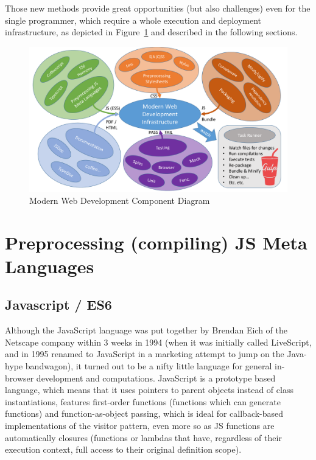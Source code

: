 Those new methods provide great opportunities (but also challenges) even for the single programmer, which require a whole execution and deployment infrastructure, as depicted in Figure~\ref{fig:webdev_cycle_components} and described in the following sections.

\begin{landscape}
\begin{figure}[ht]
	\centering
	\hspace*{-1cm}
	\vspace*{1cm}
	\includegraphics[width=1.8\textwidth]{figures/Modern_Web_Dev}
	\caption{Modern Web Development Component Diagram}
	\label{fig:webdev_cycle_components}
\end{figure}
\end{landscape}


\section{Preprocessing (compiling) JS Meta Languages}
\label{sect:language}

	\subsection{Javascript / ES6}
	\label{ssect:js_es6}
	
	Although the JavaScript language was put together by Brendan Eich of the Netscape company within 3 weeks in 1994 (when it was initially called LiveScript, and in 1995 renamed to JavaScript in a marketing attempt to jump on the Java-hype bandwagon), it turned out to be a nifty little language for general in-browser development and computations. JavaScript is a prototype based language, which means that it uses pointers to parent objects instead of class instantiations, features first-order functions (functions which can generate functions) and function-as-object passing, which is ideal for callback-based implementations of the visitor pattern, even more so as JS functions are automatically closures (functions or lambdas that have, regardless of their execution context, full access to their original definition scope).
	
